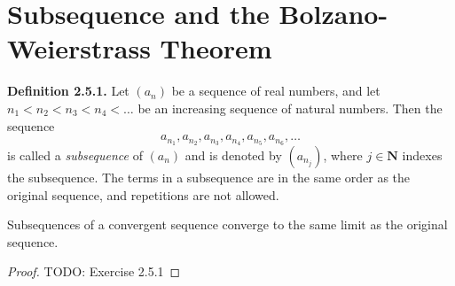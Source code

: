 \section{Subsequence and the Bolzano-Weierstrass Theorem}
    \textbf{Definition 2.5.1.} Let $(a_n)$ be a sequence of real numbers, and let $n_1 < n_2 < n_3 < n_4 < \dots$ be an increasing sequence of natural numbers. Then the sequence 
    \begin{equation*}
        a_{n_1}, a_{n_2}, a_{n_3}, a_{n_4}, a_{n_5}, a_{n_6}, \dots
    \end{equation*}
    is called a \textit{subsequence} of $(a_n)$ and is denoted by $(a_{n_j})$, where $j \in \textbf{N}$ indexes the subsequence.
    \newline \indent
    The terms in a subsequence are in the same order as the original sequence, and repetitions are not allowed.
    \setcounter{theorem}{1}
    \begin{theorem}
        Subsequences of a convergent sequence converge to the same limit as the original sequence.
    \end{theorem}
    \begin{proof}
        TODO: Exercise 2.5.1
    \end{proof}
